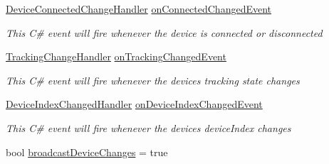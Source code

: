\begin{DoxyCompactItemize}
\mbox{\hyperlink{class_valve_1_1_v_r_1_1_steam_v_r___behaviour___pose_abb026a5887e19143d6b95452453dc8de}{Device\+Connected\+Change\+Handler}} \mbox{\hyperlink{class_valve_1_1_v_r_1_1_steam_v_r___behaviour___pose_a6892abf4f394100985f6f0caa4ee0471}{on\+Connected\+Changed\+Event}}
\begin{DoxyCompactList}\small\item\em This C\# event will fire whenever the device is connected or disconnected \end{DoxyCompactList}\item 
\mbox{\hyperlink{class_valve_1_1_v_r_1_1_steam_v_r___behaviour___pose_a699268c8115abe175fc4cbd41cb99c11}{Tracking\+Change\+Handler}} \mbox{\hyperlink{class_valve_1_1_v_r_1_1_steam_v_r___behaviour___pose_ae3372c5ebd6a668a5d100243d58a2e45}{on\+Tracking\+Changed\+Event}}
\begin{DoxyCompactList}\small\item\em This C\# event will fire whenever the device\textquotesingle{}s tracking state changes \end{DoxyCompactList}\item 
\mbox{\hyperlink{class_valve_1_1_v_r_1_1_steam_v_r___behaviour___pose_ac81003e896ac2766c36b5c7a3438ef7f}{Device\+Index\+Changed\+Handler}} \mbox{\hyperlink{class_valve_1_1_v_r_1_1_steam_v_r___behaviour___pose_a9dd0fe73f508419122ed56d737d78123}{on\+Device\+Index\+Changed\+Event}}
\begin{DoxyCompactList}\small\item\em This C\# event will fire whenever the device\textquotesingle{}s device\+Index changes \end{DoxyCompactList}\item 
bool \mbox{\hyperlink{class_valve_1_1_v_r_1_1_steam_v_r___behaviour___pose_a0569eb1ab4a75608b24ffe1adb2c0e03}{broadcast\+Device\+Changes}} = true
\end{DoxyCompactItemize}
